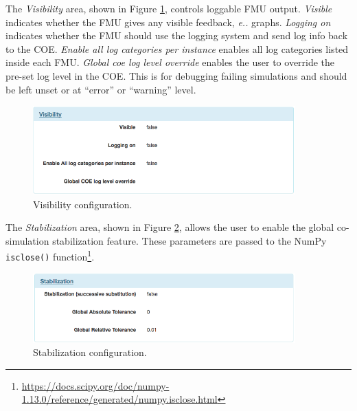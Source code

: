 The \textit{Visibility} area, shown in Figure \ref{fig:visibility-config}, controls loggable FMU output.  \emph{Visible} indicates whether the FMU gives any visible feedback, \emph{e.\@g.\@} graphs.  \emph{Logging on} indicates whether the FMU should use the logging system and send log info back to the COE.  \emph{Enable all log categories per instance} enables all log categories listed inside each FMU.  \emph{Global coe log level override} enables the user to override the pre-set log level in the COE.  This is for debugging failing simulations and should be left unset or at ``error'' or ``warning'' level.
%
%
%
\begin{figure}[ht]
\centering
\includegraphics[width=0.9\textwidth]{figures/app/visibility}
\caption{Visibility configuration.}
\label{fig:visibility-config}
\end{figure}
%
%
%

The \emph{Stabilization} area, shown in Figure \ref{fig:stabilization-config}, allows the user to enable the global co-simulation stabilization feature.  These parameters are passed to the NumPy \texttt{isclose()} function\footnote{\url{https://docs.scipy.org/doc/numpy-1.13.0/reference/generated/numpy.isclose.html}}.
%
%
%
\begin{figure}[ht]
\centering
\includegraphics[width=0.9\textwidth]{figures/app/stabilization}
\caption{Stabilization configuration.}
\label{fig:stabilization-config}
\end{figure}
%
%
%

